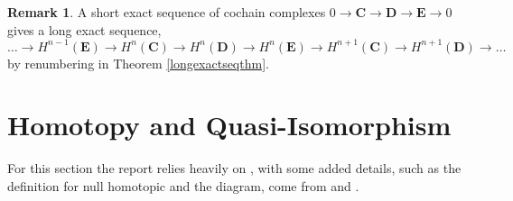 \documentclass[11.5pt, twoside, a4paper, titlepage]{report}
\theoremstyle{definition}
\newtheorem{rem}[mydef]{Remark}
\theoremstyle{plain}
\begin{document}
\begin{rem} \label{longexactseqcochainrem}
A short exact sequence of cochain complexes $0\xrightarrow{}\mathbf{C}\xrightarrow{}\mathbf{D} \xrightarrow{} \mathbf{E}\xrightarrow{}0$ gives a long exact sequence,
\begin{equation*}
\dots \xrightarrow{} H^{n-1}(\mathbf{E})\xrightarrow{}H^n(\mathbf{C})\xrightarrow{}H^n(\mathbf{D})\xrightarrow{}H^n(\mathbf{E})\xrightarrow{} H^{n+1}(\mathbf{C})\xrightarrow{} H^{n+1}(\mathbf{D})\xrightarrow{} \dots
\end{equation*}
by renumbering in Theorem \ref{longexactseqthm}.
\end{rem}


\section{Homotopy and Quasi-Isomorphism}

For this section the report relies heavily on \cite{CB1}, with some added details, such as the definition for null homotopic and the diagram, come from \cite{Weibel} and \cite{Rotman}.
\end{document}

